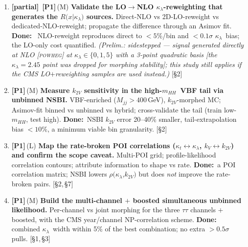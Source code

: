 \documentclass[11pt]{article}
\newcommand{\kl}{\ensuremath{\kappa_\lambda}}
\newcommand{\mhh}{\ensuremath{m_{HH}}}
\newcommand{\priO}{\textcolor{orange!85!black}{\textbf{[P1]}}}
\newcommand{\eff}[1]{{\footnotesize\textcolor{gray!65!black}{(#1)}}}
\newcommand{\sref}[1]{ {\footnotesize\textcolor{gray!60!black}{[#1]}}}
\newcommand{\dw}{\textcolor{green!30!black}{\textbf{Done:}}~}
\newcommand{\stPart}{\textcolor{orange!90!black}{\textbf{[partial]}}}
\begin{document}
\begin{enumerate}[resume,leftmargin=2.6em]
method). \textcolor{orange!75!black}{\emph{\small(Prelim.: the total-level band per \kl\ now exists ---
AN-25-103 Table 40: $+4/-18\%$ at $\kl{=}1$, $+4/-22\%$ at 2.45, $+13/-4\%$ at 5 [$m_t$ scheme]; the
\emph{component-differential} split needed for shape morphing remains open --- C4b, see \S5.)}} \sref{\S2,\,\S5}
\item \stPart\ \priO\,\eff{M} \textbf{Validate the LO$\to$NLO \kl-reweighting that generates the $R(x|$\kl$)$ sources.}
Direct-NLO vs 2D-LO-reweight vs dedicated-NLO-reweight; propagate the difference through an Asimov fit. \dw
NLO-reweight reproduces direct to $<5\%$/bin and $<0.1\sigma$ \kl\ bias; the LO-only cost quantified.
\textcolor{orange!75!black}{\emph{\small(Prelim.: sidestepped --- signal generated \emph{directly} at NLO
[\textsc{powheg}] at \kl$\in\{0,1,5\}$ with a 3-point quadratic basis [the $\kappa_\lambda=2.45$ point was dropped
for morphing stability]; this study still applies if the CMS LO$+$reweighting samples are used instead.)}} \sref{\S2}
\item \priO\,\eff{M} \textbf{Measure $k_{2V}$ sensitivity in the high-\mhh\ VBF tail via unbinned NSBI.}
VBF-enriched ($M_{jj}>400$\,GeV), $k_{2V}$-morphed MC; Asimov-fit binned vs unbinned vs hybrid; cross-validate the
tail (train low-\mhh, test high). \dw NSBI $k_{2V}$ error 20--40\% smaller, tail-extrapolation bias $<10\%$, a
minimum viable bin granularity. \sref{\S2}
\item \priO\,\eff{L} \textbf{Map the rate-broken POI correlations ($\kappa_t\!\leftrightarrow$\kl,
$k_V\!\leftrightarrow k_{2V}$) and confirm the scope caveat.} Multi-POI grid; profile-likelihood correlation
contours; attribute information to shape vs rate. \dw a POI correlation matrix; NSBI lowers $\rho($\kl,$k_{2V})$ but
does \emph{not} improve the rate-broken pairs. \sref{\S2,\,\S7}
\item \priO\,\eff{M} \textbf{Build the multi-channel $+$ boosted simultaneous unbinned likelihood.} Per-channel vs
joint morphing for the three $\tau\tau$ channels $+$ boosted, with the CMS year/channel NP-correlation scheme. \dw
combined \kl\ width within 5\% of the best combination; no extra $>0.5\sigma$ pulls. \sref{\S1,\,\S3}
\end{enumerate}
\end{document}
